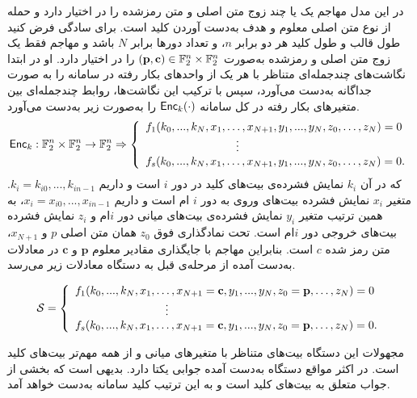 در این مدل مهاجم یک یا چند زوج متن اصلی و متن رمزشده‌ را در اختیار دارد و حمله از نوع متن اصلی معلوم و هدف به‌دست آوردن کلید است. برای سادگی فرض کنید طول قالب و طول کلید هر دو برابر 
$n$،
 و تعداد دورها برابر
$N$
باشد و مهاجم فقط یک 
زوج متن اصلی و رمزشده به‌صورت 
$(\textbf{p},\textbf{c})\in \mathbb{F}_{2}^{n}\times\mathbb{F}_{2}^{n}$
را در اختیار دارد.  او در ابتدا نگاشت‌های چندجمله‌ای متناظر با هر یک از واحدهای بکار رفته در سامانه را به صورت جداگانه به‌دست می‌آورد، سپس با ترکیب این نگاشت‌ها، روابط چندجمله‌ای بین متغیرهای بکار رفته در کل سامانه 
$\mathsf{Enc}_{k}(\cdot)$
را به‌صورت زیر به‌دست می‌آورد. 
\begin{equation*}
\Enc_{k}:\ffld_{2}^{n}\times\ffld_{2}^{n}\ra \ffld_{2}^{n} \Rightarrow\left \{ \begin{array}{ll}
f_{1}(k_{0},...,k_{N},x_{1},\ldots, x_{N+1},y_{1},...,y_{N},z_{0},\ldots, z_{N}) = 0\\
\quad\quad\quad\quad\tab\tab\vdots\\
f_{s}(k_{0},...,k_{N},x_{1},\ldots, x_{N+1} ,y_{1},...,y_{N},z_{0},\ldots, z_{N}) = 0.
\end{array} \right.
\end{equation*}
که در آن
$k_{i}$
نمایش فشرده‌ی بیت‌های کلید در دور 
$i$
است و داریم 
$k_{i} = k_{i0},...,k_{in-1}$.
متغیر 
$x_{i}$
نمایش فشرده بیت‌های وروی به دور 
$i$
ام است و داریم 
$x_{i} = x_{i0},...,x_{in-1}$،
به همین ترتیب متغیر
$y_{i}$
نمایش فشرده‌ی بیت‌های میانی دور 
$i$ام
 و 
$z_{i}$
نمایش فشرده بیت‌های خروجی دور 
$i$ام
 است. تحت نمادگذاری فوق 
$z_{0}$
همان متن اصلی 
$p$
و 
$x_{N+1}$، 
متن رمز شده 
$c$
است. بنابراین مهاجم با جایگذاری مقادیر معلوم 
$\textbf{p}$
و
$\textbf{c}$
در معادلات به‌دست آمده از مرحله‌ی قبل به دستگاه معادلات زیر می‌رسد.

\begin{equation*}
\mS = \left \{ \begin{array}{ll}
f_{1}(k_{0},...,k_{N},x_{1},\ldots, x_{N+1} = \textbf{c},y_{1},...,y_{N},z_{0} = \textbf{p},\ldots, z_{N}) = 0\\
\quad\quad\quad\quad\tab\tab\vdots\\
f_{s}(k_{0},...,k_{N},x_{1},\ldots, x_{N+1} = \textbf{c},y_{1},...,y_{N},z_{0} = \textbf{p},\ldots, z_{N}) = 0.
\end{array} \right.
\end{equation*}


 مجهولات این دستگاه بیت‌های متناظر با متغیرهای میانی و از همه مهم‌تر  بیت‌های کلید است. در اکثر مواقع دستگاه به‌دست آمده جوابی یکتا دارد. بدیهی است که بخشی از جواب متعلق به بیت‌های کلید است و به این ترتیب کلید سامانه به‌دست خواهد آمد. 

